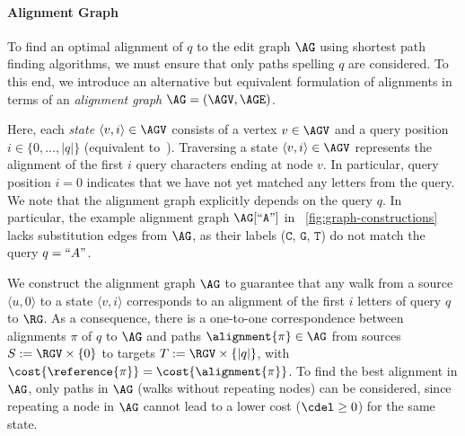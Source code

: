 
\paragraph{Alignment Graph}
To find an optimal alignment of $q$ to the edit graph $\AG$ using shortest path
finding algorithms, we must ensure that only paths spelling $q$ are considered.
To this end, we introduce an alternative but equivalent formulation of
alignments in terms of an \emph{alignment graph} $\AG=(\AGV,\AGE)$.

Here, each \emph{state} $\langle v,i \rangle \in \AGV$ consists of a vertex $v \in
\AGV$ and a query position $i \in \{0,\dots,|q|\}$ (equivalent
to~\cite{rautiainen_aligning_2017}). Traversing a state $\langle v,i \rangle \in
\AGV$ represents the alignment of the first $i$ query characters ending at node $v$.
%
In particular, query position $i=0$ indicates that we have not yet matched any
letters from the query.
%
We note that the alignment graph explicitly depends on the query $q$. In
particular, the example alignment graph $\AG[``\texttt{A}"]$ in
~\cref{fig:graph-constructions} lacks substitution edges from $\AG$, as their
labels ($\texttt{C}$, $\texttt{G}$, $\texttt{T}$) do not match the query
$q=``A"$.

We construct the alignment graph $\AG$ to guarantee that any walk from a source
$\langle u,0 \rangle$ to a state $\langle v,i \rangle$ corresponds to an
alignment of the first $i$ letters of query $q$ to $\RG$. As a consequence,
there is a one-to-one correspondence between alignments $\pi$ of $q$ to
$\AG$ and paths $\alignment{\pi} \in \AG$ from sources $S:=\RGV \times \{0\}$ to
targets $T:=\RGV \times \{|q|\}$, with
$\cost{\reference{\pi}}=\cost{\alignment{\pi}}$. To find the best alignment in
$\AG$, only paths in $\AG$ (walks without repeating nodes) can be considered,
since repeating a node in $\AG$ cannot lead to a lower cost ($\cdel \geq 0$) for
the same state.

